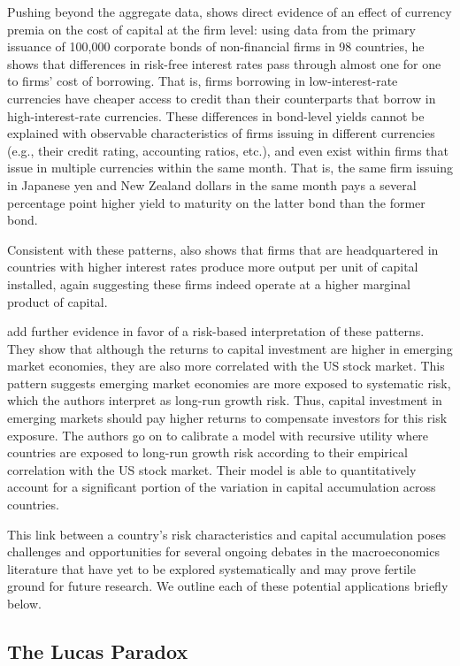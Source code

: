 \documentclass{ar-1col}
\begin{document}
Pushing beyond the aggregate data, \citet{Richers2020} shows direct evidence of an effect of currency premia on the cost of capital at the firm level: using data from the primary issuance of 100,000 corporate bonds of non-financial firms in 98 countries, he shows that differences in risk-free interest rates pass through almost one for one to firms' cost of borrowing. That is, firms borrowing in low-interest-rate currencies have cheaper access to credit than their counterparts that borrow in high-interest-rate currencies. These differences in bond-level yields cannot be explained with observable characteristics of firms issuing in different currencies (e.g., their credit rating, accounting ratios, etc.), and even exist within firms that issue in multiple currencies within the same month. That is, the same firm issuing in Japanese yen and New Zealand dollars in the same month pays a several percentage point higher yield to maturity on the latter bond than the former bond.

Consistent with these patterns, \citet{Richers2020} also shows that firms that are headquartered in countries with higher interest rates produce more output per unit of capital installed, again suggesting these firms indeed operate at a higher marginal product of capital.

\citet{DavidHenriksenSimonovska2014} add further evidence in favor of a risk-based interpretation of these patterns. They show that although the returns to capital investment are higher in emerging market economies, they are also more correlated with the US stock market. This pattern suggests emerging market economies are more exposed to systematic risk, which the authors interpret as long-run growth risk. Thus, capital investment in emerging markets should pay higher returns to compensate investors for this risk exposure. The authors go on to calibrate a model with recursive utility where countries are exposed to long-run growth risk according to their empirical correlation with the US stock market. Their model is able to quantitatively account for a significant portion of the variation in capital accumulation across countries.

This link between a country's risk characteristics and capital accumulation poses challenges and opportunities for several ongoing debates in the macroeconomics literature that have yet to be explored systematically and may prove fertile ground for future research. We outline each of these potential applications briefly below.

\subsection{The Lucas Paradox}
\end{document}
